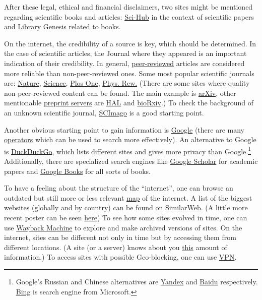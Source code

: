 \documentclass{article}
\begin{document}
After these legal, ethical and financial disclaimers, two sites might be mentioned regarding scientific books and articles: \href{https://en.wikipedia.org/wiki/Sci-Hub}{Sci-Hub} in the context of scientific papers and \href{https://en.wikipedia.org/wiki/Library_Genesis}{Library Genesis} related to books.

On the internet, the credibility of a source is key, which should be determined. In the case of scientific articles, the Journal where they appeared is an important indication of their credibility. In general, \href{https://en.wikipedia.org/wiki/Peer_review}{peer-reviewed} articles are considered more reliable than non-peer-reviewed ones. Some most popular scientific journals are: \href{https://www.nature.com/}{Nature}, \href{https://www.sciencemag.org/}{Science}, \href{https://journals.plos.org/plosone/}{Plos One}, \href{https://journals.aps.org/}{Phys. Rew.} (There are some sites where quality non-peer-reviewed content can be found. The main example is \href{https://arxiv.org/}{arXiv}, other mentionable \href{https://en.wikipedia.org/wiki/List_of_preprint_repositories}{preprint servers} are \href{https://hal.archives-ouvertes.fr/}{HAL} and \href{https://www.biorxiv.org/}{bioRxiv}.) To check the background of an unknown scientific journal, \href{https://www.scimagojr.com/}{SCImago} is a good starting point.

Another obvious starting point to gain information is \href{https://www.google.com/}{Google} (there are many \href{https://ahrefs.com/blog/google-advanced-search-operators/}{operators} which can be used to search more effectively).
An alternative to Google is \href{https://duckduckgo.com/}{DuckDuckGo}, which lists different sites and gives more privacy than Google.\footnote{Google's Russian and Chinese alternatives are \href{https://yandex.com/}{Yandex} and \href{https://www.baidu.com/}{Baidu} respectively. \href{https://www.bing.com/}{Bing} is search engine from Microsoft.}
Additionally, there are specialized search engines like \href{https://scholar.google.com/}{Google Scholar} for academic papers and \href{https://books.google.co.uk/}{Google Books} for all sorts of books.

To have a feeling about the structure of the ``internet'', one can browse an outdated but still more or less relevant \href{https://web.archive.org/web/20230221000817/http://internet-map.net/}{map} of the internet. A list of the biggest websites (globally and by country) can be found on \href{https://www.similarweb.com/}{SimilarWeb}. (A little more recent poster can be seen \href{https://www.visualcapitalist.com/wp-content/uploads/2019/08/top-100-websites-ranking.html}{here})
To see how some sites evolved in time, one can use \href{https://archive.org/web/}{Wayback Machine} to explore and make archived versions of sites. 
On the internet, sites can be different not only in time but by accessing them from different locations. (A site (or a server) knows about you \href{https://whatismyipaddress.com/}{this} amount of information.) To access sites with possible Geo-blocking, one can use \href{https://www.howtogeek.com/133680/htg-explains-what-is-a-vpn/}{VPN}.
\end{document}
